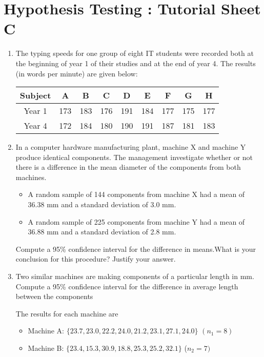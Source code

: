 \documentclass[]{article}
\begin{document}
\section*{Hypothesis Testing : Tutorial Sheet C}

\begin{enumerate}


\item The typing speeds for one group of eight IT students were recorded both at the beginning of
year 1 of their studies and at the end of year 4. The results (in words per minute) are given
below:
\begin{center}
\begin{tabular}{|c|c|c|c|c|c|c|c|c|} \hline 
  Subject & A& B& C& D& E& F& G& H \\ \hline
Year 1& 173& 183& 176& 191& 184& 177& 175& 177 \\ \hline
Year 4& 172& 184& 180& 190& 191& 187& 181& 183 \\ \hline
\end{tabular}
\end{center}


\item 
In a computer hardware manufacturing plant, machine X and machine Y
produce identical components. The management investigate whether or
not there is a difference in the mean diameter of the components from
both machines.
\begin{itemize}
\item A random sample of 144 components from machine X had a mean of
36.38 mm and a standard deviation of 3.0 mm.
\item  A random sample of 225 components from machine Y had a mean of
36.88 mm and a standard deviation of 2.8 mm.
\end{itemize}
Compute a 95\% confidence interval for the difference in means.What is your conclusion for this procedure? Justify your
answer.
\item Two similar machines are making components of a particular length in mm.
Compute a 95\% confidence interval for the difference in average length between the components

The results for each machine are
\begin{itemize}
\item Machine A: $\{23.7, 23.0, 22.2, 24.0, 21.2, 23.1, 27.1, 24.0\}$ $(n_1 = 8)$
\item Machine B: $\{23.4, 15.3, 30.9, 18.8, 25.3, 25.2, 32.1\}$ ($n_2 = 7)$
\end{itemize}


\end{enumerate}
\end{document}
